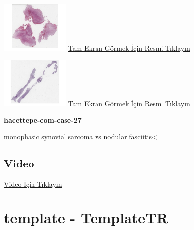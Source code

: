 \documentclass[
  letterpaper,
  DIV=11,
  numbers=noendperiod]{scrreprt}
\begin{document}
\href{https://images.patolojiatlasi.com/hacettepe-com-case-27/HE1.html}{\includegraphics[width=0.25\textwidth,height=\textheight]{./screenshots/thumbnail_hacettepe-com-case-27-1.png}}
\href{https://images.patolojiatlasi.com/hacettepe-com-case-27/HE1.html}{Tam
Ekran Görmek İçin Resmi Tıklayın}

\href{https://images.patolojiatlasi.com/hacettepe-com-case-27/HE2.html}{\includegraphics[width=0.25\textwidth,height=\textheight]{./screenshots/thumbnail_hacettepe-com-case-27-2.png}}
\href{https://images.patolojiatlasi.com/hacettepe-com-case-27/HE2.html}{Tam
Ekran Görmek İçin Resmi Tıklayın}

\textbf{hacettepe-com-case-27}

\begin{tcolorbox}[enhanced jigsaw, breakable, opacitybacktitle=0.6, arc=.35mm, colbacktitle=quarto-callout-tip-color!10!white, colback=white, toptitle=1mm, left=2mm, opacityback=0, colframe=quarto-callout-tip-color-frame, titlerule=0mm, rightrule=.15mm, bottomrule=.15mm, toprule=.15mm, bottomtitle=1mm, title=\textcolor{quarto-callout-tip-color}{\faLightbulb}\hspace{0.5em}{Tanı}, coltitle=black, leftrule=.75mm]

monophasic synovial sarcoma vs nodular fasciitis\textless{}

\end{tcolorbox}

\hypertarget{video-26}{%
\subsection{Video}\label{video-26}}

\href{https://www.youtube.com/watch?v=c2ePAdTH00g}{Video İçin Tıklayın}

\hypertarget{sec-template}{%
\section{template - TemplateTR}\label{sec-template}}
\end{document}
